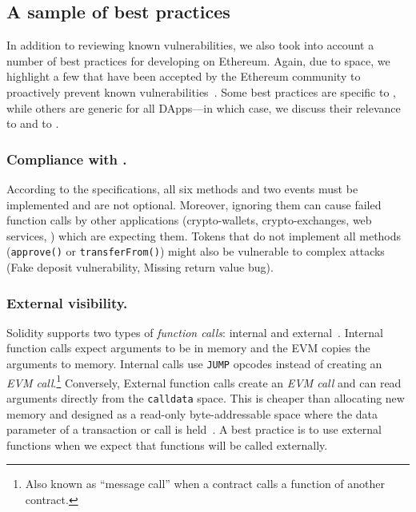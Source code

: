 
\subsection{A sample of best practices}\label{section:bp}

In addition to reviewing known vulnerabilities, we also took into account a number of best practices for developing \erc on Ethereum. Again, due to space, we highlight a few that have been accepted by the Ethereum community to proactively prevent known vulnerabilities~\cite{TokenBP}. Some best practices are specific to \erc, while others are generic for all DApps---in which case, we discuss their relevance to \erc and to \sys.

\subsubsection{Compliance with \erc.}

According to the \erc specifications, all six methods and two events must be implemented and are not optional. Moreover, ignoring them can cause failed function calls by other applications (\ie crypto-wallets, crypto-exchanges, web services, \etc) which are expecting them. Tokens that do not implement all methods (\eg \texttt{approve()} or \texttt{transferFrom()}) might also be vulnerable to complex attacks (\eg Fake deposit vulnerability\cite{DEPOSafe}, Missing return value bug\cite{ErcBug}).

\subsubsection{External visibility.}\label{subsec:external}

Solidity supports two types of \textit{function calls}: internal and external~\cite{SolidityDoc}. Internal function calls expect arguments to be in memory and the EVM copies the arguments to memory. Internal calls use \texttt{JUMP} opcodes instead of creating an \textit{EVM call}.\footnote{Also known as ``message call'' when a contract calls a function of another contract.} Conversely, External function calls create an \textit{EVM call} and can read arguments directly from the \texttt{calldata} space. This is cheaper than allocating new memory and designed as a read-only byte-addressable space where the data parameter of a transaction or call is held~\cite{EthInDepth}. A best practice is to use external functions when we expect that functions will be called externally.

